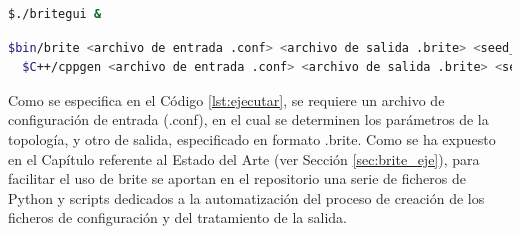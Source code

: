\begin{lstlisting}[language=bash, style=Consola, caption={Ejecución de la interfaz gráfica de \gls{brite}}, label={lst:britegui}]
  $./britegui &
\end{lstlisting}

\vspace{3mm}

\begin{lstlisting}[language=bash, style=Consola, caption={Ejecucion de \gls{brite} por la línea de comandos}, label={lst:ejecutar}]
  $bin/brite <archivo de entrada .conf> <archivo de salida .brite> <seed_file>  
  $C++/cppgen <archivo de entrada .conf> <archivo de salida .brite> <seed_file>
\end{lstlisting}

\vspace{3mm}

Como se especifica en el Código \ref{lst:ejecutar}, se requiere un archivo de configuración de entrada (.conf), en el cual se determinen los parámetros de la topología, y otro de salida, especificado en formato .brite. Como se ha expuesto en el Capítulo referente al Estado del Arte (ver Sección \ref{sec:brite_eje}), para facilitar el uso de \gls{brite} se aportan en el repositorio una serie de ficheros de Python y scripts dedicados a la automatización del proceso de creación de los ficheros de configuración y del tratamiento de la salida.























